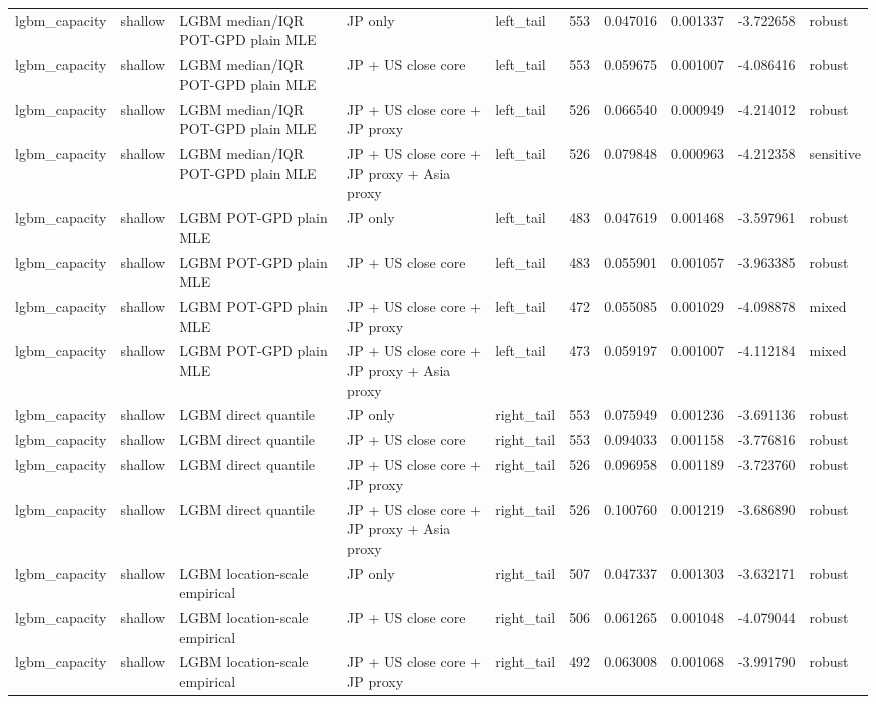 \begin{tabular}{lll l lrrrrl}
lgbm\_capacity & shallow & LGBM median/IQR POT-GPD plain MLE & JP only & left\_tail & 553 & 0.047016 & 0.001337 & -3.722658 & robust \\
lgbm\_capacity & shallow & LGBM median/IQR POT-GPD plain MLE & JP + US close core & left\_tail & 553 & 0.059675 & 0.001007 & -4.086416 & robust \\
lgbm\_capacity & shallow & LGBM median/IQR POT-GPD plain MLE & JP + US close core + JP proxy & left\_tail & 526 & 0.066540 & 0.000949 & -4.214012 & robust \\
lgbm\_capacity & shallow & LGBM median/IQR POT-GPD plain MLE & JP + US close core + JP proxy + Asia proxy & left\_tail & 526 & 0.079848 & 0.000963 & -4.212358 & sensitive \\
lgbm\_capacity & shallow & LGBM POT-GPD plain MLE & JP only & left\_tail & 483 & 0.047619 & 0.001468 & -3.597961 & robust \\
lgbm\_capacity & shallow & LGBM POT-GPD plain MLE & JP + US close core & left\_tail & 483 & 0.055901 & 0.001057 & -3.963385 & robust \\
lgbm\_capacity & shallow & LGBM POT-GPD plain MLE & JP + US close core + JP proxy & left\_tail & 472 & 0.055085 & 0.001029 & -4.098878 & mixed \\
lgbm\_capacity & shallow & LGBM POT-GPD plain MLE & JP + US close core + JP proxy + Asia proxy & left\_tail & 473 & 0.059197 & 0.001007 & -4.112184 & mixed \\
lgbm\_capacity & shallow & LGBM direct quantile & JP only & right\_tail & 553 & 0.075949 & 0.001236 & -3.691136 & robust \\
lgbm\_capacity & shallow & LGBM direct quantile & JP + US close core & right\_tail & 553 & 0.094033 & 0.001158 & -3.776816 & robust \\
lgbm\_capacity & shallow & LGBM direct quantile & JP + US close core + JP proxy & right\_tail & 526 & 0.096958 & 0.001189 & -3.723760 & robust \\
lgbm\_capacity & shallow & LGBM direct quantile & JP + US close core + JP proxy + Asia proxy & right\_tail & 526 & 0.100760 & 0.001219 & -3.686890 & robust \\
lgbm\_capacity & shallow & LGBM location-scale empirical & JP only & right\_tail & 507 & 0.047337 & 0.001303 & -3.632171 & robust \\
lgbm\_capacity & shallow & LGBM location-scale empirical & JP + US close core & right\_tail & 506 & 0.061265 & 0.001048 & -4.079044 & robust \\
lgbm\_capacity & shallow & LGBM location-scale empirical & JP + US close core + JP proxy & right\_tail & 492 & 0.063008 & 0.001068 & -3.991790 & robust \\

\end{tabular}

